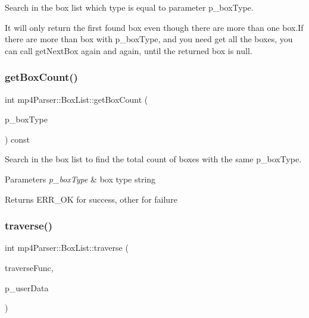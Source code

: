 Search in the box list which type is equal to parameter p\+\_\+box\+Type. 

It will only return the first found box even though there are more than one box.\+If there are more than box with p\+\_\+box\+Type, and you need get all the boxes, you can call get\+Next\+Box again and again, until the returned box is null. \mbox{\label{classmp4_parser_1_1_box_list_ac8f02d0f68e98f348019268127eba98a}} 
\subsubsection{\texorpdfstring{getBoxCount()}{getBoxCount()}}
{\footnotesize\ttfamily int mp4\+Parser\+::\+Box\+List\+::get\+Box\+Count (\begin{DoxyParamCaption}\item[{const char $\ast$}]{p\+\_\+box\+Type }\end{DoxyParamCaption}) const}



Search in the box list to find the total count of boxes with the same p\+\_\+box\+Type. 


\begin{DoxyParams}{Parameters}
{\em p\+\_\+box\+Type} & box type string \\
\hline
\end{DoxyParams}
\begin{DoxyReturn}{Returns}
E\+R\+R\+\_\+\+OK for success, other for failure 
\end{DoxyReturn}
\mbox{\label{classmp4_parser_1_1_box_list_a24de75849802054ff8d40a12f1120f85}} 
\subsubsection{\texorpdfstring{traverse()}{traverse()}}
{\footnotesize\ttfamily int mp4\+Parser\+::\+Box\+List\+::traverse (\begin{DoxyParamCaption}\item[{Traverse\+Func\+\_\+t}]{traverse\+Func,  }\item[{void $\ast$}]{p\+\_\+user\+Data }\end{DoxyParamCaption})}



